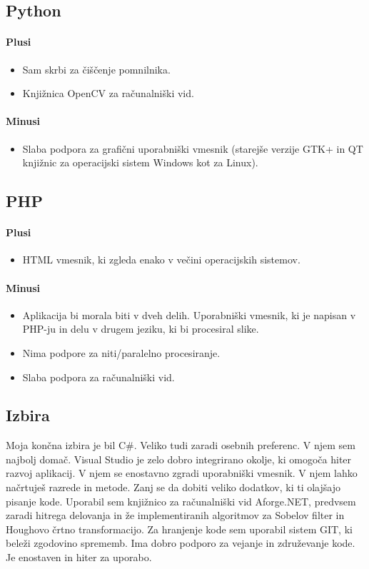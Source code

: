 \documentclass[oneside, a4paper, 12pt]{book}
\begin{document}
\subsection{Python}
\paragraph{Plusi}
\begin{itemize}
\item Sam skrbi za čiščenje pomnilnika.
\item Knjižnica OpenCV za računalniški vid.
\end{itemize}
\paragraph{Minusi}
\begin{itemize}
\item Slaba podpora za grafični uporabniški vmesnik (starejše verzije GTK+ in QT knjižnic za operacijski sistem Windows kot za Linux).
\end{itemize}

\subsection{PHP}
\paragraph{Plusi}
\begin{itemize}
\item HTML vmesnik, ki zgleda enako v večini operacijskih sistemov.
\end{itemize}
\paragraph{Minusi}
\begin{itemize}
\item Aplikacija bi morala biti v dveh delih. Uporabniški vmesnik, ki je napisan v PHP-ju in delu v drugem jeziku, ki bi procesiral slike.
\item Nima podpore za niti/paralelno procesiranje.
\item Slaba podpora za računalniški vid.
\end{itemize}

\subsection{Izbira}
Moja končna izbira je bil C\#. Veliko tudi zaradi osebnih preferenc. V njem sem najbolj domač. Visual Studio je zelo dobro integrirano okolje, ki omogoča hiter razvoj aplikacij. V njem se enostavno zgradi uporabniški vmesnik. V njem lahko načrtuješ razrede in metode. Zanj se da dobiti veliko dodatkov, ki ti olajšajo pisanje kode. Uporabil sem knjižnico za računalniški vid Aforge.NET, predvsem zaradi hitrega delovanja in že implementiranih algoritmov za Sobelov filter in Houghovo črtno transformacijo. Za hranjenje kode sem uporabil sistem GIT, ki beleži zgodovino sprememb. Ima dobro podporo za vejanje in združevanje kode. Je enostaven in hiter za uporabo.
\end{document}
